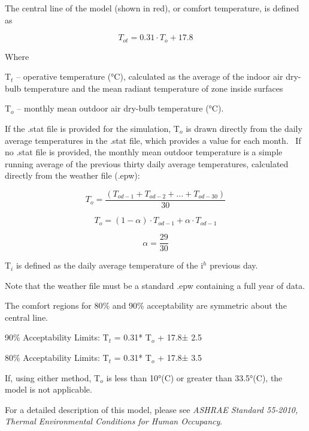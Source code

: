 The central line of the model (shown in red), or comfort temperature, is defined as

\begin{equation}
{T_{ot}} = 0.31\cdot {T_o} + 17.8
\end{equation}

Where

T\(_{t}\) -- operative temperature (°C), calculated as the average of the indoor air dry-bulb temperature and the mean radiant temperature of zone inside surfaces

T\(_{o}\) -- monthly mean outdoor air dry-bulb temperature (°C).

If the .stat file is provided for the simulation, T\(_{o}\) is drawn directly from the daily average temperatures in the .stat file, which provides a value for each month.~ If no .stat file is provided, the monthly mean outdoor temperature is a simple running average of the previous thirty daily average temperatures, calculated directly from the weather file (.epw):

\begin{equation}
{T_o} = \frac{{\left( {{T_{od - 1}} + {T_{od - 2}} + ... + {T_{od - 30}}} \right)}}{{30}}
\end{equation}

\begin{equation}
{T_o} = (1 - \alpha )\cdot {T_{od - 1}} + \alpha \cdot {T_{od - 1}}
\end{equation}

\begin{equation}
\alpha  = \frac{{29}}{{30}}
\end{equation}

T\(_{i}\) is defined as the daily average temperature of the i\(^{h}\) previous day.

Note that the weather file must be a standard .epw containing a full year of data.

The comfort regions for 80\% and 90\% acceptability are symmetric about the central line.

90\% Acceptability Limits: T\(_{t}\) = 0.31* T\(_{o}\) + 17.8± 2.5

80\% Acceptability Limits: T\(_{t}\) = 0.31* T\(_{o}\) + 17.8± 3.5

If, using either method, T\(_{o}\) is less than 10°(C) or greater than 33.5°(C), the model is not applicable.

For a detailed description of this model, please see \emph{ASHRAE Standard 55-2010, Thermal Environmental Conditions for Human Occupancy}.

